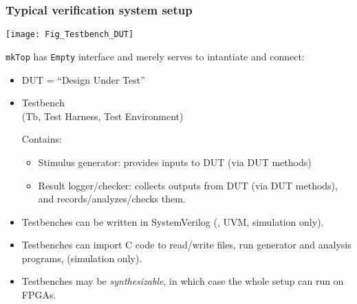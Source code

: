 \begin{frame}[fragile]
\frametitle{Typical verification system setup}

\footnotesize

\begin{minipage}{0.59\textwidth}
 \texttt{[image: Fig\_Testbench\_DUT]}
\end{minipage}
\hfill
\begin{minipage}{0.4\textwidth}

{\tt mkTop} has {\tt Empty} interface and merely serves to intantiate
and connect:

\begin{itemize}
    \item DUT = ``Design Under Test''

    \item Testbench \\
        (Tb, Test Harness, Test Environment)

        \vx
        Contains:
        \begin{itemize}\scriptsize
            \item Stimulus generator: provides inputs to DUT (via DUT methods)

            \vx
            \item Result logger/checker: collects outputs from DUT
                (via DUT methods), and records/analyzes/checks them.

        \end{itemize}

\end{itemize}

\end{minipage}

\begin{itemize}
    \item Testbenches can be written in SystemVerilog ({\eg}, UVM, simulation only).

    \item Testbenches can import C code to read/write files, run
        generator and analysis programs, {\etc} (simulation only).

    \item Testbenches may be \emph{synthesizable}, in which case the
        whole setup can run on FPGAs.

\end{itemize}

\end{frame}


